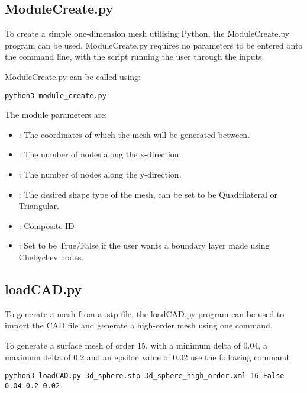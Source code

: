 


\subsection{Module\textunderscore Create.py}

To create a simple one-dimension mesh utilising Python, the Module\textunderscore Create.py program can be used.
Module\textunderscore Create.py requires no parameters to be entered onto the command line, with the script running the user through the inputs.

Module\textunderscore Create.py can be called using:
\begin{lstlisting}[style=BashInputStyle]
python3 module_create.py
\end{lstlisting}

The module parameters are:

\begin{itemize}
    \item {}: The coordinates of which the mesh will be generated between.
    \item {}: The number of nodes along the x-direction.
    \item {}: The number of nodes along the y-direction.
    \item {}: The desired shape type of the mesh, can be set to be Quadrilateral or Triangular.
    \item {}: Composite ID
    \item {}: Set to be True/False if the user wants a boundary layer made using Chebychev nodes.
\end{itemize}

\subsection{loadCAD.py}

To generate a mesh from a .stp file, the loadCAD.py program can be used to import the CAD file and generate a high-order mesh using one command.

To generate a surface mesh of order 15, with a minimum delta of 0.04, a maximum delta of 0.2 and an epsilon value of 0.02 use the following command:

\begin{lstlisting}[style=BashInputStyle]
python3 loadCAD.py 3d_sphere.stp 3d_sphere_high_order.xml 16 False 0.04 0.2 0.02
\end{lstlisting}

